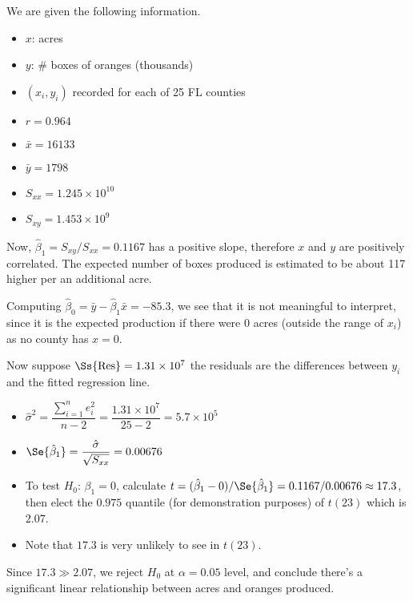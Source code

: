 \begin{example}
    We are given the following information.
    \begin{itemize}
        \item $ x $: acres
        \item $ y $: \# boxes of oranges (thousands)
        \item $ (x_i,y_i) $ recorded for each of 25 FL counties
        \item $ r=0.964 $
        \item $ \bar{x}=16133 $
        \item $ \bar{y}=1798 $
        \item $ S_{xx}=1.245\times 10^{10} $
        \item $ S_{xy}=1.453\times 10^9 $
    \end{itemize}
    Now,
    $ \hat{\beta}_1=S_{xy}/S_{xx}=0.1167 $
    has a positive slope, therefore $ x $ and $ y $ are
    positively correlated.
    The expected number of boxes produced is estimated to be about 117
    higher per an additional acre.

    Computing
    $ \hat{\beta}_0=\bar{y}-\hat{\beta}_1\bar{x}=-85.3 $,
    we see that it is
    not meaningful to interpret, since it
    is the expected production if there were 0 acres
    (outside the range of $ x_i $) as no county has $ x=0 $.

    Now suppose $ \Ss{\text{Res}}=1.31\times 10^7 $
    the residuals are the differences between $ y_i $ and the fitted regression
    line.
    \begin{itemize}
        \item $ \hat{\sigma}^2=\dfrac{\sum_{i=1}^{n} e_i^2}{n-2}=
                  \dfrac{1.31\times 10^7}{25-2}=5.7\times 10^5 $
        \item $ \Se{\hat{\beta}_1}=\dfrac{\hat{\sigma}}{\sqrt{S_{xx}}}=0.00676 $
        \item To test $ H_0 $: $ \beta_1 =0 $,
              calculate
              $ t=(\hat{\beta}_1-0)/\Se{\hat{\beta}_1}=0.1167/0.00676
                  \approx 17.3 $,
              then elect the $ 0.975 $ quantile (for demonstration purposes) of $ t(23) $
              which is $ 2.07 $.
        \item Note that $ 17.3 $ is very unlikely to see in $ t(23) $.
    \end{itemize}
    Since $ 17.3\gg2.07 $, we reject $ H_0 $ at $ \alpha=0.05 $
    level, and conclude there's a significant linear relationship between
    acres and oranges produced.


\end{example}
